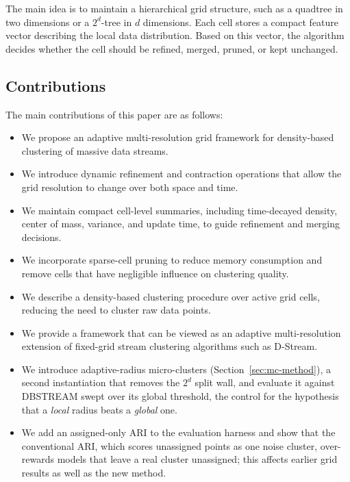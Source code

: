 \documentclass[11pt]{article}
\begin{document}
The main idea is to maintain a hierarchical grid structure, such as a quadtree in two dimensions or a $2^d$-tree in $d$ dimensions. Each cell stores a compact feature vector describing the local data distribution. Based on this vector, the algorithm decides whether the cell should be refined, merged, pruned, or kept unchanged.

\subsection{Contributions}

The main contributions of this paper are as follows:

\begin{itemize}
    \item We propose an adaptive multi-resolution grid framework for density-based clustering of massive data streams.
    
    \item We introduce dynamic refinement and contraction operations that allow the grid resolution to change over both space and time.
    
    \item We maintain compact cell-level summaries, including time-decayed density, center of mass, variance, and update time, to guide refinement and merging decisions.
    
    \item We incorporate sparse-cell pruning to reduce memory consumption and remove cells that have negligible influence on clustering quality.
    
    \item We describe a density-based clustering procedure over active grid cells, reducing the need to cluster raw data points.
    
    \item We provide a framework that can be viewed as an adaptive multi-resolution extension of fixed-grid stream clustering algorithms such as D-Stream.

    \item We introduce adaptive-radius micro-clusters (Section~\ref{sec:mc-method}), a second instantiation that removes the $2^d$ split wall, and evaluate it against DBSTREAM swept over its global threshold, the control for the hypothesis that a \emph{local} radius beats a \emph{global} one.

    \item We add an assigned-only ARI to the evaluation harness and show that the conventional ARI, which scores unassigned points as one noise cluster, over-rewards models that leave a real cluster unassigned; this affects earlier grid results as well as the new method.
\end{itemize}
\end{document}
